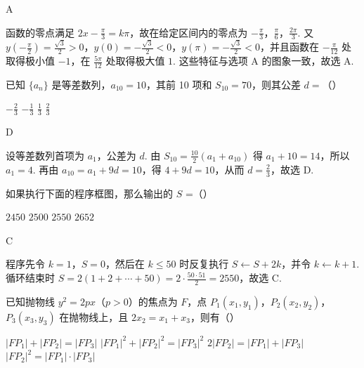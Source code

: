 \begin{answer}
A
\end{answer}

\begin{solution}
函数的零点满足 \(2x-\frac{\pi}{3}=k\pi\)，故在给定区间内的零点为 \(-\frac{\pi}{3}\)，\(\frac{\pi}{6}\)，\(\frac{2\pi}{3}\). 又 \(y(-\frac{\pi}{2})=\frac{\sqrt{3}}{2}>0\)，\(y(0)=-\frac{\sqrt{3}}{2}<0\)，\(y(\pi)=-\frac{\sqrt{3}}{2}<0\)，并且函数在 \(-\frac{\pi}{12}\) 处取得极小值 \(-1\)，在 \(\frac{5\pi}{12}\) 处取得极大值 \(1\). 这些特征与选项 A 的图象一致，故选 A.
\end{solution}

\begin{problem}
已知 \(\{a_{n}\}\) 是等差数列，\(a_{10} = 10\)，其前 10 项和 \(S_{10} = 70\)，则其公差 \(d =\)（\quad）

\choices
    {\(-\frac{2}{3}\)}
    {\(-\frac{1}{3}\)}
    {\( \frac{1}{3} \)}
    {\( \frac{2}{3} \)}
\end{problem}

\begin{answer}
D
\end{answer}

\begin{solution}
设等差数列首项为 \(a_1\)，公差为 \(d\). 由 \(S_{10}=\frac{10}{2}(a_1+a_{10})\) 得 \(a_1+10=14\)，所以 \(a_1=4\). 再由 \(a_{10}=a_1+9d=10\)，得 \(4+9d=10\)，从而 \(d=\frac{2}{3}\)，故选 D.
\end{solution}

\begin{problem}
如果执行下面的程序框图，那么输出的 \(S\) =（\quad）


\choices
    {\(2450\)}
    {\(2500\)}
    {\(2550\)}
    {\(2652\)}
\end{problem}

\begin{answer}
C
\end{answer}

\begin{solution}
程序先令 \(k=1\)，\(S=0\)，然后在 \(k\leqslant 50\) 时反复执行 \(S\leftarrow S+2k\)，并令 \(k\leftarrow k+1\). 循环结束时
\(S=2(1+2+\cdots+50)=2\cdot\frac{50\cdot51}{2}=2550\)，故选 C.
\end{solution}

\begin{problem}
已知抛物线 \( y^{2} = 2px \)（\( p > 0 \)）的焦点为 \(F\)，点 \( P_{1}(x_{1}, y_{1}) \)，\( P_{2}(x_{2}, y_{2}) \)，\( P_{3}(x_{3}, y_{3}) \) 在抛物线上，且 \( 2x_{2} = x_{1} + x_{3} \)，则有（\quad）

\choices
    {\( |FP_{1}| + |FP_{2}| = |FP_{3}| \)}
    {\( |FP_{1}|^{2} + |FP_{2}|^{2} = |FP_{3}|^{2} \)}
    {\(2|FP_{2}| = |FP_{1}| + |FP_{3}|\)}
    {\( |FP_{2}|^{2} = |FP_{1}| \cdot |FP_{3}| \)}
\end{problem}

